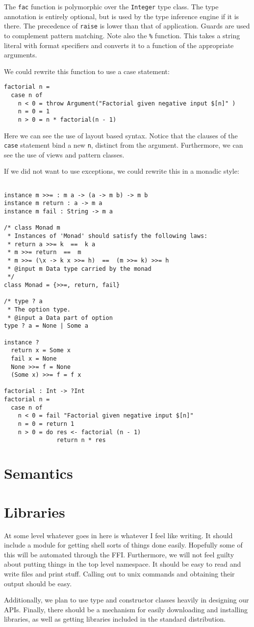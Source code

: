 \documentclass[]{article}
\begin{document}
The \texttt{fac} function is polymorphic over the \texttt{Integer} type class. The type annotation is entirely optional, but is used by the type inference engine if it is there. The precedence of \texttt{raise} is lower than that of application. Guards are used to complement pattern matching. Note also the \texttt{\%} function. This takes a string literal with format specifiers and converts it to a function of the appropriate arguments.

We could rewrite this function to use a case statement:
\begin{verbatim}
factorial n =
  case n of
    n < 0 = throw Argument("Factorial given negative input $[n]" )
    n = 0 = 1
    n > 0 = n * factorial(n - 1)
\end{verbatim}
Here we can see the use of layout based syntax. Notice that the clauses of the \texttt{case} statement bind a new \texttt{n}, distinct from the argument. Furthermore, we can see the use of views and pattern classes.

If we did not want to use exceptions, we could rewrite this in a monadic style:

\begin{verbatim}

instance m >>= : m a -> (a -> m b) -> m b
instance m return : a -> m a
instance m fail : String -> m a

/* class Monad m
 * Instances of 'Monad' should satisfy the following laws:
 * return a >>= k  ==  k a
 * m >>= return  ==  m
 * m >>= (\x -> k x >>= h)  ==  (m >>= k) >>= h
 * @input m Data type carried by the monad
 */
class Monad = {>>=, return, fail}

/* type ? a
 * The option type.
 * @input a Data part of option
type ? a = None | Some a

instance ?
  return x = Some x
  fail x = None
  None >>= f = None
  (Some x) >>= f = f x

factorial : Int -> ?Int
factorial n = 
  case n of
    n < 0 = fail "Factorial given negative input $[n]"
    n = 0 = return 1
    n > 0 = do res <- factorial (n - 1)
               return n * res
\end{verbatim}

\section{Semantics}

\section{Libraries}
At some level whatever goes in here is whatever I feel like writing. It should include a module for getting shell sorts of things done easily. Hopefully some of this will be automated through the FFI. Furthermore, we will not feel guilty about putting things in the top level namespace. It should be easy to read and write files and print stuff. Calling out to unix commands and obtaining their output should be easy.

Additionally, we plan to use type and constructor classes heavily in designing our APIs. Finally, there should be a mechanism for easily downloading and installing libraries, as well as getting libraries included in the standard distribution.
\end{document}
